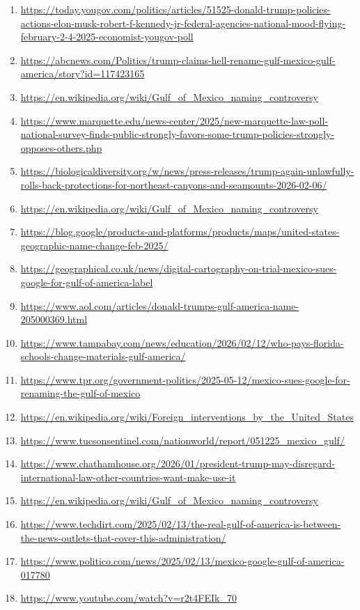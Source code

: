 \documentclass[10pt,a4paper]{article}
\begin{document}
\begin{enumerate}[leftmargin=*]
            \item \url{ https://today.yougov.com/politics/articles/51525-donald-trump-policies-actions-elon-musk-robert-f-kennedy-jr-federal-agencies-national-mood-flying-february-2-4-2025-economist-yougov-poll }
            \item \url{ https://abcnews.com/Politics/trump-claims-hell-rename-gulf-mexico-gulf-america/story?id=117423165 }
            \item \url{ https://en.wikipedia.org/wiki/Gulf\_of\_Mexico\_naming\_controversy }
            \item \url{ https://www.marquette.edu/news-center/2025/new-marquette-law-poll-national-survey-finds-public-strongly-favors-some-trump-policies-strongly-opposes-others.php }
            \item \url{ https://biologicaldiversity.org/w/news/press-releases/trump-again-unlawfully-rolls-back-protections-for-northeast-canyons-and-seamounts-2026-02-06/ }
            \item \url{ https://en.wikipedia.org/wiki/Gulf\_of\_Mexico\_naming\_controversy }
            \item \url{ https://blog.google/products-and-platforms/products/maps/united-states-geographic-name-change-feb-2025/ }
            \item \url{ https://geographical.co.uk/news/digital-cartography-on-trial-mexico-sues-google-for-gulf-of-america-label }
            \item \url{ https://www.aol.com/articles/donald-trumps-gulf-america-name-205000369.html }
            \item \url{ https://www.tampabay.com/news/education/2026/02/12/who-pays-florida-schools-change-materials-gulf-america/ }
            \item \url{ https://www.tpr.org/government-politics/2025-05-12/mexico-sues-google-for-renaming-the-gulf-of-mexico }
            \item \url{ https://en.wikipedia.org/wiki/Foreign\_interventions\_by\_the\_United\_States }
            \item \url{ https://www.tucsonsentinel.com/nationworld/report/051225\_mexico\_gulf/ }
            \item \url{ https://www.chathamhouse.org/2026/01/president-trump-may-disregard-international-law-other-countries-want-make-use-it }
            \item \url{ https://en.wikipedia.org/wiki/Gulf\_of\_Mexico\_naming\_controversy }
            \item \url{ https://www.techdirt.com/2025/02/13/the-real-gulf-of-america-is-between-the-news-outlets-that-cover-this-administration/ }
            \item \url{ https://www.politico.com/news/2025/02/13/mexico-google-gulf-of-america-017780 }
            \item \url{ https://www.youtube.com/watch?v=r2t4FEIk\_70 }
    \end{enumerate}
\vspace{1em}
\end{document}
